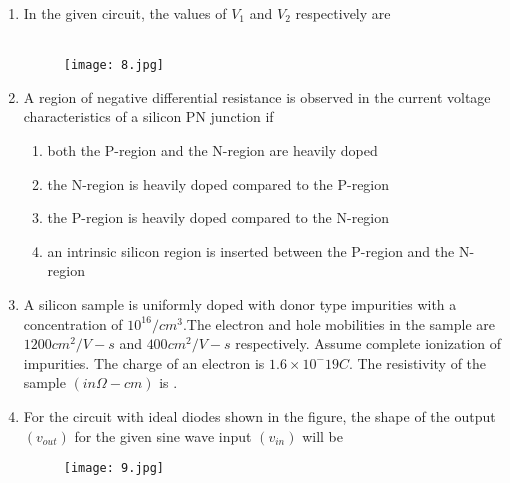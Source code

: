 \documentclass[12pt,-letter paper]{article}
\providecommand{\brak}[1]{\ensuremath{\left(#1\right)}}
\theoremstyle{remark}
\begin{document}
\begin{enumerate}
    \newpage\item In the given circuit, the values of $V_1$ and $V_2$ respectively are \\ \\
    \begin{figure}[H]
        \centering
        \texttt{[image: 8.jpg]}
    \end{figure}
    \item A region of negative differential resistance is observed in the current voltage characteristics of a silicon PN junction if
    \begin{enumerate}
        \item both the P-region and the N-region are heavily doped
        \item the N-region is heavily doped compared to the P-region
        \item the P-region is heavily doped compared to the N-region
        \item an intrinsic silicon region is inserted between the P-region and the N-region
    \end{enumerate}
    \item A silicon sample is uniformly doped with donor type impurities with a concentration of $10^16/cm^3$.The electron and hole mobilities in the sample are $1200cm^2/V-s$ and $400cm^2/V-s$ respectively. Assume complete ionization of impurities. The charge of an electron is $1.6×10^-19 C$. The resistivity of the sample $\brak{in \Omega-cm}$ is \underline{\hspace{2cm}}.    
   \newpage \item For the circuit with ideal diodes shown in the figure, the shape of the output $\brak{v_{out}}$ for the given sine wave input $\brak{v_{in}}$ will be
     \begin{figure}[h]
        \centering
        \texttt{[image: 9.jpg]}
     \end{figure}
 \begin{figure}[h]

\end{figure}
\end{enumerate}
\end{document}
